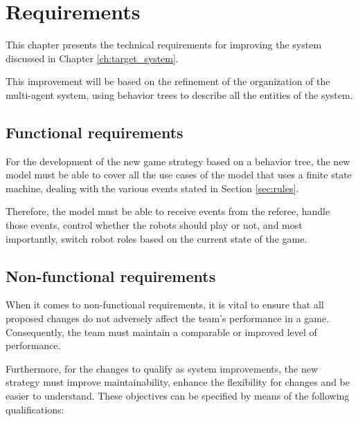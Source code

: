 \chapter{Requirements}
\label{ch:requirements}

This chapter presents the technical requirements for improving the system discussed in Chapter \ref{ch:target_system}.

This improvement will be based on the refinement of the organization of the multi-agent system, using behavior trees to describe all the entities of the system.

\section{Functional requirements}

For the development of the new game strategy based on a behavior tree, the new model must be able to cover all the use cases of the model that uses a finite state machine, dealing with the various events stated in Section \ref{sec:rules}.

Therefore, the model must be able to receive events from the referee, handle those events, control whether the robots should play or not, and most importantly, switch robot roles based on the current state of the game.

\section{Non-functional requirements}

When it comes to non-functional requirements, it is vital to ensure that all proposed changes do not adversely affect the team's performance in a game. Consequently, the team must maintain a comparable or improved level of performance.

Furthermore, for the changes to qualify as system improvements, the new strategy must improve maintainability, enhance the flexibility for changes and be easier to understand. These objectives can be specified by means of the following qualifications:

